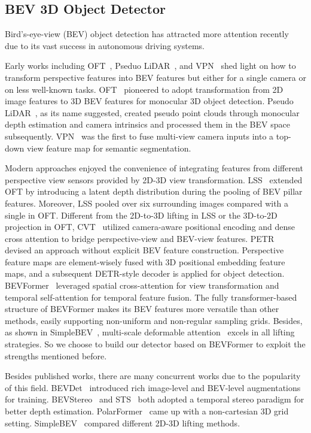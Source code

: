 \documentclass[10pt,twocolumn,letterpaper]{article}
\begin{document}
\subsection{BEV 3D Object Detector}
Bird's-eye-view (BEV) object detection has attracted more attention recently~\cite{OFT,VPN,pseudo-lidar,LSS,bevformer,CVT,PETR} due to its vast success in autonomous driving systems. 

Early works including OFT~\cite{OFT}, Pseduo LiDAR~\cite{pseudo-lidar}, and VPN~\cite{VPN} shed light on how to transform perspective features into BEV features but either for a single camera or on less well-known tasks. 
OFT~\cite{OFT} pioneered to adopt transformation from 2D image features to 3D BEV features for monocular 3D object detection.
Pseudo LiDAR~\cite{pseudo-lidar}, as its name suggested, created pseudo point clouds through monocular depth estimation and camera intrinsics and processed them in the BEV space subsequently.
VPN~\cite{VPN} was the first to fuse multi-view camera inputs into a top-down view feature map for semantic segmentation.

Modern approaches enjoyed the convenience of integrating features from different perspective view sensors provided by 2D-3D view transformation.
LSS~\cite{LSS} extended OFT by introducing a latent depth distribution during the pooling of BEV pillar features. 
Moreover, LSS pooled over six surrounding images compared with a single in OFT.
Different from the 2D-to-3D lifting in LSS or the 3D-to-2D projection in OFT, CVT~\cite{CVT} utilized camera-aware positional encoding and dense cross attention to bridge perspective-view and BEV-view features.
PETR~\cite{PETR} devised an approach without explicit BEV feature construction. 
Perspective feature maps are element-wisely fused with 3D positional embedding feature maps, and a subsequent DETR-style decoder is applied for object detection.
BEVFormer~\cite{bevformer} leveraged spatial cross-attention for view transformation and temporal self-attention for temporal feature fusion. 
The fully transformer-based structure of BEVFormer makes its BEV features more versatile than other methods, easily supporting non-uniform and non-regular sampling grids.
Besides, as shown in SimpleBEV~\cite{simplebev}, multi-scale deformable attention~\cite{deformable-detr} excels in all lifting strategies.
So we choose to build our detector based on BEVFormer to exploit the strengths mentioned before.

Besides published works, there are many concurrent works due to the popularity of this field.
BEVDet~\cite{BEVDet} introduced rich image-level and BEV-level augmentations for training. 
BEVStereo~\cite{bevstereo} and STS~\cite{STS} both adopted a temporal stereo paradigm for better depth estimation.
PolarFormer~\cite{polarformer} came up with a non-cartesian 3D grid setting.
SimpleBEV~\cite{simplebev} compared different 2D-3D lifting methods.
\end{document}

